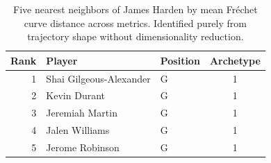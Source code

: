 \begin{table}[htbp]
  \centering\small
  \begin{tabular}{rllc}
    \toprule
    Rank & Player & Position & Archetype \\
    \midrule
    1 & Shai Gilgeous-Alexander & G & 1 \\
    2 & Kevin Durant & G & 1 \\
    3 & Jeremiah Martin & G & 1 \\
    4 & Jalen Williams & G & 1 \\
    5 & Jerome Robinson & G & 1 \\
    \bottomrule
  \end{tabular}
  \caption{Five nearest neighbors of James Harden by mean Fr\'{e}chet curve distance across metrics. Identified purely from trajectory shape without dimensionality reduction.}
  \label{tab:James_Harden_frechet_curve_neighbors}
\end{table}


